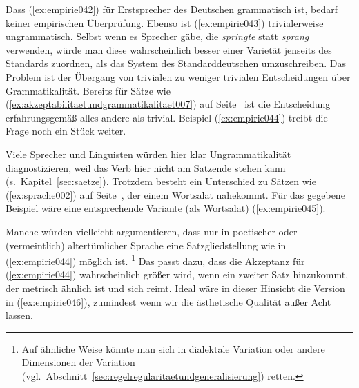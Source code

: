 Dass (\ref{ex:empirie042}) für Erstsprecher des Deutschen grammatisch ist, bedarf keiner empirischen Überprüfung.
Ebenso ist (\ref{ex:empirie043}) trivialerweise ungrammatisch.
Selbst wenn es Sprecher gäbe, die \textit{springte} statt \textit{sprang} verwenden, würde man diese wahrscheinlich besser einer Varietät jenseits des Standards zuordnen, als das System des Standarddeutschen umzuschreiben.
Das Problem ist der Übergang von trivialen zu weniger trivialen Entscheidungen über Grammatikalität.
Bereits für Sätze wie (\ref{ex:akzeptabilitaetundgrammatikalitaet007}) auf Seite~\pageref{ex:akzeptabilitaetundgrammatikalitaet007} ist die Entscheidung erfahrungsgemäß alles andere als trivial.
Beispiel (\ref{ex:empirie044}) treibt die Frage noch ein Stück weiter.

\begin{exe}
\end{exe}

Viele Sprecher und Linguisten würden hier klar Ungrammatikalität diagnostizieren, weil das Verb hier nicht am Satzende stehen kann (s.\ Kapitel~\ref{sec:saetze}).
Trotzdem besteht ein Unterschied zu Sätzen wie (\ref{ex:sprache002}) auf Seite~\pageref{ex:sprache002}, der einem Wortsalat nahekommt.
Für das gegebene Beispiel wäre eine entsprechende Variante (als Wortsalat) \zB (\ref{ex:empirie045}).

\begin{exe}
\end{exe}

Manche würden vielleicht argumentieren, dass nur in poetischer oder (vermeintlich) altertümlicher Sprache eine Satzgliedstellung wie in (\ref{ex:empirie044}) möglich ist.%
\footnote{Auf ähnliche Weise könnte man sich in dialektale Variation oder andere Dimensionen der Variation (vgl.\ Abschnitt~\ref{sec:regelregularitaetundgeneralisierung}) retten.}
Das passt dazu, dass die Akzeptanz für (\ref{ex:empirie044}) wahrscheinlich größer wird, wenn ein zweiter Satz hinzukommt, der metrisch ähnlich ist und sich reimt.
Ideal wäre in dieser Hinsicht die Version in (\ref{ex:empirie046}), zumindest wenn wir die ästhetische Qualität außer Acht lassen.

\begin{exe}
\end{exe}

